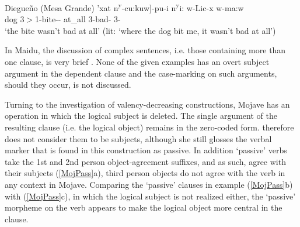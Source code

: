 \begin{exe}\ex\label{DieDep} {Diegue\~no (Mesa Grande)} \citep[Yuman; California; ][135]{Gorbet:1976}\nopagebreak[4]
\gll  {\rm[}'xat n\textsuperscript{y}-cu:kuw{\rm]}-pu-i n\textsuperscript{y}i: w-Lic-x w-ma:w\\
dog 3$>$1-bite-\dem{}-\loc{} at\_all 3-bad-\irr{} 3-\Neg{}\\
`the bite wasn't bad at all' (lit: `where the dog bit me, it wasn't bad at all') \end{exe}

In Maidu, the discussion of complex sentences, i.e. those containing more than one clause, is very brief \citep[69--70]{Shipley:1964}. 
None of the given examples has an overt subject argument in the dependent clause and the case-marking on such arguments, should they occur, is not discussed.  






Turning to the investigation of valency-decreasing constructions, Mojave has an operation in which the logical subject is deleted.  
The single argument of the resulting clause (i.e. the logical object) remains in the zero-coded form. 
\citet{Munro:1976} therefore does not consider them to be subjects, although she still glosses the verbal marker that is found in this construction as passive. 
In addition `passive' verbs take the 1st and 2nd person object-agreement suffixes, and as such, agree with their subjects (\ref{MojPass}a), third person objects do not agree with the verb in any context in Mojave.
Comparing the `passive' clauses in example (\ref{MojPass}b) with (\ref{MojPass}c), in which the logical subject is not realized either, the `passive' morpheme on the verb appears to  make the logical object more central in the clause.

